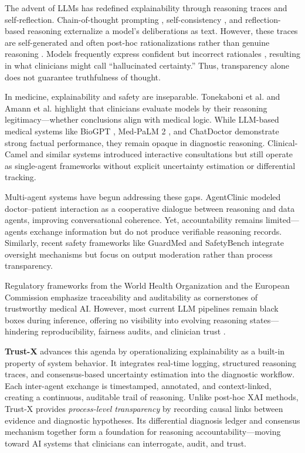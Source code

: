 \documentclass[letterpaper]{article} %
\begin{document}
The advent of LLMs has redefined explainability through reasoning traces and self-reflection. Chain-of-thought prompting \cite{wei2022chain}, self-consistency \cite{wang2022self}, and reflection-based reasoning \cite{shinn2023reflexion} externalize a model’s deliberations as text. However, these traces are self-generated and often post-hoc rationalizations rather than genuine reasoning \cite{turpin2023language}. Models frequently express confident but incorrect rationales \cite{kadavath2022language,ji2023survey}, resulting in what clinicians might call “hallucinated certainty.” Thus, transparency alone does not guarantee truthfulness of thought.

In medicine, explainability and safety are inseparable. Tonekaboni et al. \cite{tonekaboni2019clinicians} and Amann et al. \cite{amann2020explainability} highlight that clinicians evaluate models by their reasoning legitimacy—whether conclusions align with medical logic. While LLM-based medical systems like BioGPT \cite{luo2022biogpt}, Med-PaLM 2 \cite{singhal2025toward}, and ChatDoctor \cite{li2023chatdoctor} demonstrate strong factual performance, they remain opaque in diagnostic reasoning. Clinical-Camel \cite{toma2023clinical} and similar systems introduced interactive consultations but still operate as single-agent frameworks without explicit uncertainty estimation or differential tracking.

Multi-agent systems have begun addressing these gaps. AgentClinic \cite{schmidgall2024agentclinic} modeled doctor–patient interaction as a cooperative dialogue between reasoning and data agents, improving conversational coherence. Yet, accountability remains limited—agents exchange information but do not produce verifiable reasoning records. Similarly, recent safety frameworks like GuardMed and SafetyBench integrate oversight mechanisms but focus on output moderation rather than process transparency.

Regulatory frameworks from the World Health Organization \cite{guidance2021ethics} and the European Commission \cite{bomhard2021regulation} emphasize traceability and auditability as cornerstones of trustworthy medical AI. However, most current LLM pipelines remain black boxes during inference, offering no visibility into evolving reasoning states—hindering reproducibility, fairness audits, and clinician trust \cite{begoli2019need,doshi2017towards}.

\textbf{Trust-X} advances this agenda by operationalizing explainability as a built-in property of system behavior. It integrates real-time logging, structured reasoning traces, and consensus-based uncertainty estimation into the diagnostic workflow. Each inter-agent exchange is timestamped, annotated, and context-linked, creating a continuous, auditable trail of reasoning. Unlike post-hoc XAI methods, Trust-X provides \emph{process-level transparency} by recording causal links between evidence and diagnostic hypotheses. Its differential diagnosis ledger and consensus mechanism together form a foundation for reasoning accountability—moving toward AI systems that clinicians can interrogate, audit, and trust.
\end{document}

